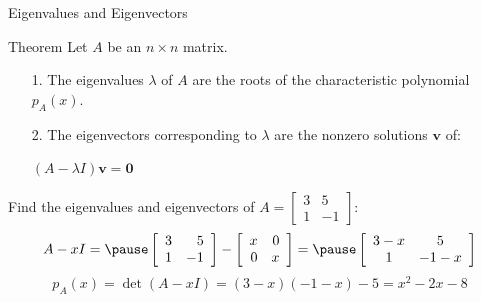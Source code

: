 \documentclass{beamer}
\newcommand{\vv}{\mathbf{v}}
\begin{document}
\begin{frame}{Eigenvalues and Eigenvectors}

\begin{block}{Theorem}
Let \(A\) be an \(n \times n\) matrix.
\begin{enumerate}
    \item[1. ] The eigenvalues \(\lambda\) of \(A\) are the roots of the characteristic polynomial \(p_{A}(x)\).
    
    \item[2. ] The eigenvectors corresponding to \(\lambda\) are the nonzero solutions $\vv$ of:\\
    \begin{center}
$(A-\lambda I)\vv = \mathbf{0}$
    \end{center}\end{enumerate}
\end{block}
\pause

\begin{example}
Find the eigenvalues and eigenvectors of
$    A = \left[ \begin{array}{rr} 3 & 5 \\ 1 & -1 \end{array}\right]$:
\pause\[A-xI =\pause\left[ \begin{array}{rr} 3 & 5 \\ 1 & -1 \end{array}\right] - \left[ \begin{array}{rr} x & 0 \\ 0 & x \end{array}\right] = \pause\left[ \begin{array}{cc}  3-x & 5 \\ 1 & -1-x \end{array}\right] \]\pause
\[ p_A(x)=\det(A-xI) = (3-x)(-1-x)-5= x^2 - 2 x - 8\]
\end{example}


\end{frame}
\end{document}
